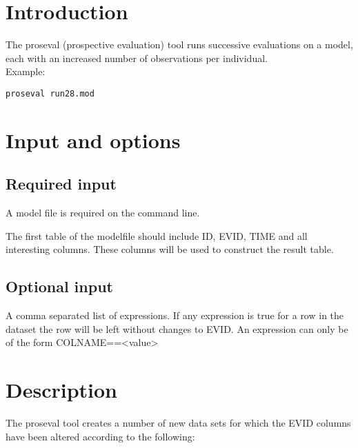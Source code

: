

\newcommand{\guidetoolname}{proseval}



\maketitle


\section{Introduction}
The proseval (prospective evaluation) tool runs successive evaluations on a model, each with an increased number of observations per individual.\\
Example:
\begin{verbatim}
proseval run28.mod
\end{verbatim}

\section{Input and options}

\subsection{Required input}
A model file is required on the command line.

The first table of the modelfile should include ID, EVID, TIME and all interesting columns. These columns will be used to
construct the result table.

\subsection{Optional input}

\begin{optionlist}
	A comma separated list of expressions. If any expression is true for a row in the dataset the row
    will be left without changes to EVID. An expression can only be of the form COLNAME==<value>
\nextopt
\end{optionlist}

\section{Description}
The proseval tool creates a number of new data sets for which the EVID columns have been altered according to the following:

